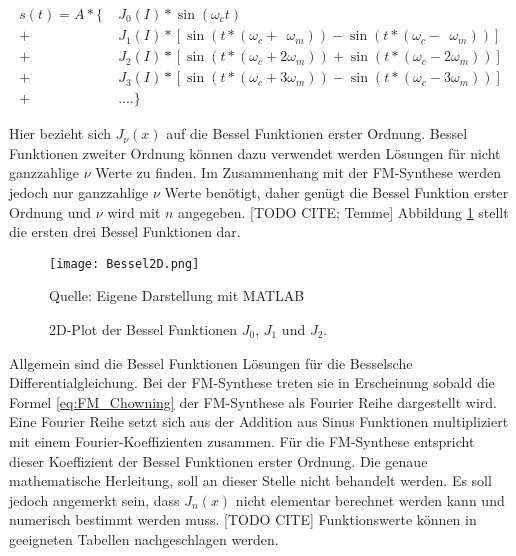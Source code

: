 
\begin{equation}
\begin{split}
s(t)=A*\{\; & J_0(I)*\sin(\omega_c t)  \\
         +&J_1(I)*[\sin(t*(\omega_c + \;\,\omega_m))-\sin(t*(\omega_c-\;\,\omega_m))] \\
         +&J_2(I)*[\sin(t*(\omega_c + 2\omega_m))+\sin(t*(\omega_c-2\omega_m))] \\
         +&J_3(I)*[\sin(t*(\omega_c + 3\omega_m))-\sin(t*(\omega_c-3\omega_m))] \\
         +&....\}
\end{split}
\label{eq:chowningAddition}
\end{equation}

Hier bezieht sich $J_\nu(x)$ auf die Bessel Funktionen erster Ordnung. Bessel Funktionen zweiter Ordnung können dazu verwendet werden Lösungen für nicht ganzzahlige $\nu$ Werte zu finden. Im Zusammenhang mit der FM-Synthese werden jedoch nur ganzzahlige $\nu$ Werte benötigt, daher genügt die Bessel Funktion erster Ordnung und $\nu$ wird mit $n$ angegeben. [TODO CITE; Temme] Abbildung \ref{fig:bessel2D} stellt die ersten drei Bessel Funktionen dar.

\begin{figure} [ht]
\centering
  \texttt{[image: Bessel2D.png]}
\caption{2D-Plot der Bessel Funktionen $J_0$, $J_1$ und $J_2$.}
\label{fig:bessel2D}
Quelle: Eigene Darstellung mit MATLAB
\end{figure}

\FloatBarrier


Allgemein sind die Bessel Funktionen Lösungen für die Besselsche Differentialgleichung. Bei der FM-Synthese treten sie in Erscheinung sobald die Formel \ref{eq:FM_Chowning} der FM-Synthese als Fourier Reihe dargestellt wird. Eine Fourier Reihe setzt sich aus der Addition aus Sinus Funktionen multipliziert mit einem Fourier-Koeffizienten zusammen. Für die FM-Synthese entspricht dieser Koeffizient der Bessel Funktionen erster Ordnung. \cite[S. 221]{lathi} Die genaue mathematische Herleitung, soll an dieser Stelle nicht behandelt werden. Es soll jedoch angemerkt sein, dass $J_n(x)$ nicht elementar berechnet werden kann und numerisch bestimmt werden muss. [TODO CITE] \cite[S. 385]{abramowitz} Funktionswerte können in geeigneten Tabellen nachgeschlagen werden. \cite{davis}


